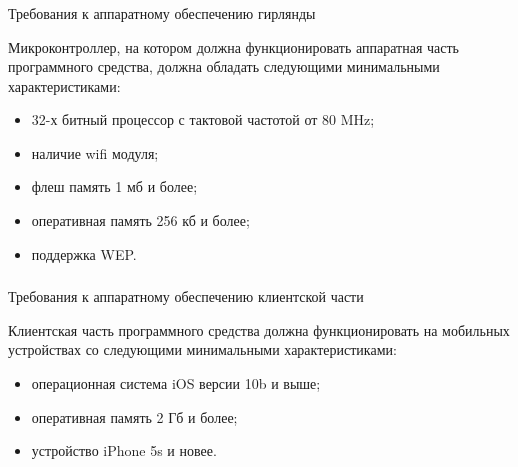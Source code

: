 

\subsubsection{} Требования к аппаратному обеспечению гирлянды
\label{sec:subject:specification:server_requirments}

Микроконтроллер, на котором должна функционировать аппаратная часть программного средства, должна обладать следующими минимальными характеристиками:

\begin{itemize}
	\item 32-х битный процессор с тактовой частотой от 80 MHz;
	\item наличие wifi модуля;
	\item флеш память 1 мб и более;
	\item оперативная память 256 кб и более;
	\item поддержка WEP.
\end{itemize}

\subsubsection{} Требования к аппаратному обеспечению клиентской части
\label{sec:subject:specification:client_requirments}

Клиентская часть программного средства должна функционировать на мобильных устройствах со следующими минимальными характеристиками:

\begin{itemize}
	\item операционная система iOS версии 10b и выше;
	\item оперативная память 2 Гб и более;
	\item устройство iPhone 5s и новее.
\end{itemize}

